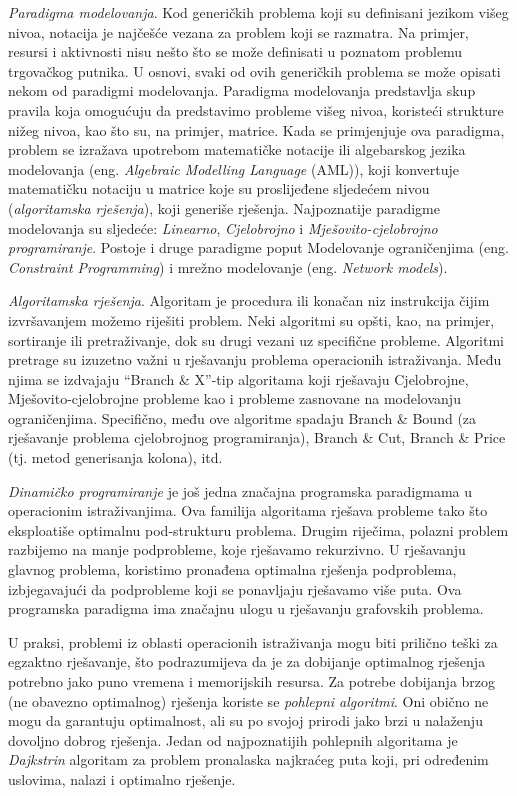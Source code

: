 \documentclass[a4paper, utf8, 11pt, colorlinks]{book}
\theoremstyle{definition}
\begin{document}
\emph{Paradigma modelovanja}. Kod generičkih problema koji su definisani jezikom višeg nivoa, notacija je najčešće vezana za problem koji se razmatra.
Na primjer, resursi i aktivnosti nisu nešto što se može definisati u poznatom problemu trgovačkog putnika. U osnovi, svaki od ovih generičkih problema se može opisati nekom od paradigmi modelovanja. Paradigma modelovanja predstavlja skup pravila koja omogućuju da predstavimo probleme višeg nivoa, koristeći strukture nižeg nivoa, kao što su, na primjer, matrice. Kada se primjenjuje ova paradigma, problem se izražava upotrebom matematičke notacije ili algebarskog jezika modelovanja (eng. \emph{Algebraic Modelling Language} (AML)), koji konvertuje matematičku notaciju u matrice koje su proslijeđene sljedećem nivou (\emph{algoritamska rješenja}), koji generiše rješenja. Najpoznatije paradigme modelovanja su sljedeće: \textit{Linearno}, \textit{Cjelobrojno} i \textit{Mješovito-cjelobrojno programiranje}. Postoje i druge paradigme poput Modelovanje ograničenjima (eng. \emph{Constraint Programming}) i mrežno modelovanje (eng. \emph{Network models}). 

\emph{Algoritamska rješenja}. Algoritam je procedura ili konačan niz instrukcija čijim izvršavanjem možemo riješiti problem. Neki algoritmi su opšti, kao, na primjer, sortiranje ili pretraživanje,  dok su drugi vezani uz specifične probleme. Algoritmi pretrage su izuzetno važni u rješavanju problema operacionih istraživanja. Među njima se izdvajaju ``Branch \& X''-tip algoritama koji rješavaju Cjelobrojne, Mješovito-cjelobrojne probleme kao i probleme zasnovane na modelovanju ograničenjima. Specifično, među ove algoritme spadaju Branch \& Bound (za rješavanje problema cjelobrojnog programiranja), Branch \& Cut, Branch \& Price (tj. metod generisanja kolona), itd.

\emph{Dinamičko programiranje} je još jedna značajna programska paradigmama  u operacionim istraživanjima. Ova familija algoritama rješava probleme tako što eksploatiše optimalnu pod-strukturu problema. Drugim riječima, polazni problem razbijemo na manje podprobleme, koje rješavamo rekurzivno. U rješavanju glavnog problema, koristimo pronađena optimalna rješenja podproblema, izbjegavajući da podprobleme koji se ponavljaju rješavamo više puta. Ova programska paradigma ima značajnu ulogu u rješavanju grafovskih problema. 

U praksi, problemi iz oblasti operacionih istraživanja mogu biti prilično teški za egzaktno rješavanje, što podrazumijeva da je za dobijanje optimalnog rješenja potrebno jako puno vremena i memorijskih resursa. Za potrebe dobijanja brzog (ne obavezno optimalnog) rješenja  koriste se \emph{pohlepni algoritmi}. Oni obično ne mogu 
da garantuju optimalnost, ali su   po svojoj prirodi jako brzi u nalaženju dovoljno dobrog rješenja. Jedan od najpoznatijih pohlepnih algoritama je \emph{Dajkstrin} algoritam za problem pronalaska najkraćeg puta koji, pri određenim uslovima, nalazi i optimalno rješenje. 
\end{document}
